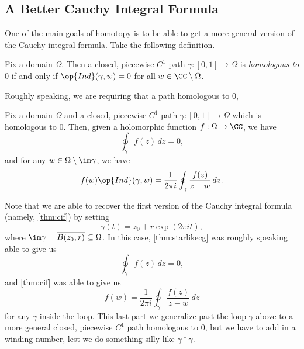 \subsection{A Better Cauchy Integral Formula}
One of the main goals of homotopy is to be able to get a more general version of the Cauchy integral formula. Take the following definition.
\begin{definition}
	Fix a domain $\Omega$. Then a closed, piecewise $C^1$ path $\gamma:[0,1]\to\Omega$ is \textit{homologous to $0$} if and only if $\op{Ind}(\gamma,w)=0$ for all $w\in\CC\setminus\Omega$.
\end{definition}
Roughly speaking, we are requiring that a path homologous to $0$, 
\begin{theorem} \label{thm:cif2}
	Fix a domain $\Omega$ and a closed, piecewise $C^1$ path $\gamma:[0,1]\to\Omega$ which is homologous to $0$. Then, given a holomorphic function $f:\Omega\to\CC$, we have
	\[\oint_\gamma f(z)\,dz=0,\]
	and for any $w\in\Omega\setminus\im\gamma$, we have
	\[f(w)\op{Ind}(\gamma,w)=\frac1{2\pi i}\oint_\gamma\frac{f(z)}{z-w}\,dz.\]
\end{theorem}
Note that we are able to recover the first version of the Cauchy integral formula (namely, \autoref{thm:cif}) by setting
\[\gamma(t)=z_0+r\exp(2\pi it),\]
where $\im\gamma=\overline{B(z_0,r)}\subseteq\Omega$. In this case, \autoref{thm:starlikecg} was roughly speaking able to give us
\[\oint_\gamma f(z)\,dz=0,\]
and \autoref{thm:cif} was able to give us
\[f(w)=\frac1{2\pi i}\oint_\gamma\frac{f(z)}{z-w}\,dz\]
for any $\gamma$ inside the loop. This last part we generalize past the loop $\gamma$ above to a more general closed, piecewise $C^1$ path homologous to $0$, but we have to add in a winding number, lest we do something silly like $\gamma*\gamma$.

